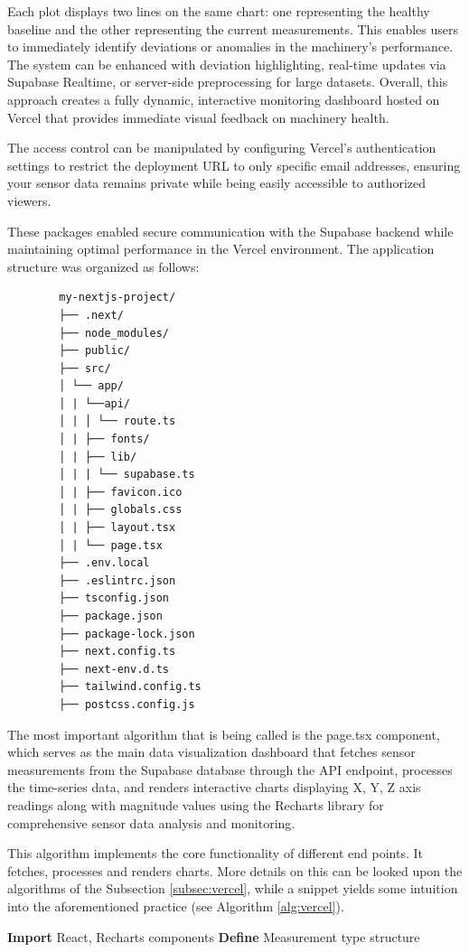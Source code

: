 {	Each plot displays two lines on the same chart: one representing the healthy baseline and the other representing the current measurements. This enables users to immediately identify deviations or anomalies in the machinery’s performance. The system can be enhanced with deviation highlighting, real-time updates via Supabase Realtime, or server-side preprocessing for large datasets. Overall, this approach creates a fully dynamic, interactive monitoring dashboard hosted on Vercel that provides immediate visual feedback on machinery health.
	
	The access control can be manipulated by configuring Vercel's authentication settings to restrict the deployment URL to only specific email addresses, ensuring your sensor data remains private while being easily accessible to authorized viewers.
	
	These packages enabled secure communication with the Supabase backend while maintaining optimal performance in the Vercel environment. The application structure was organized as follows:
	
	\begin{verbatim}
		my-nextjs-project/
		├── .next/
		├── node_modules/
		├── public/
		├── src/
		│ └── app/
		│ | └──api/
		│ |	│ └── route.ts
		│ |	├── fonts/
		│ |	├── lib/
		│ | | └── supabase.ts
		│ | ├── favicon.ico
		│ | ├── globals.css
		│ | ├── layout.tsx
		│ | └── page.tsx
		├── .env.local
		├── .eslintrc.json
		├── tsconfig.json
		├── package.json
		├── package-lock.json
		├── next.config.ts
		├── next-env.d.ts
		├── tailwind.config.ts
		├── postcss.config.js						
	\end{verbatim}
	
	The most important algorithm that is being called is the page.tsx component, which serves as the main data visualization dashboard that fetches sensor measurements from the Supabase database through the API endpoint, processes the time-series data, and renders interactive charts displaying X, Y, Z axis readings along with magnitude values using the Recharts library for comprehensive sensor data analysis and monitoring.
	
	This algorithm implements the core functionality of different end points. It fetches, processes and renders charts. More details on this can be looked upon the algorithms of the Subsection \ref{subsec:vercel}, while a snippet yields some intuition into the aforementioned practice (see Algorithm \ref{alg:vercel}).
	
	\begin{algorithm}[H]
		\caption{Sensor Data Visualization Algorithm}
		\label{alg:vercel}
		\begin{algorithmic}[1]
			\STATE \textbf{Import} React, Recharts components
			\STATE \textbf{Define} Measurement type structure
			

\end{algorithmic}
\end{algorithm}}
